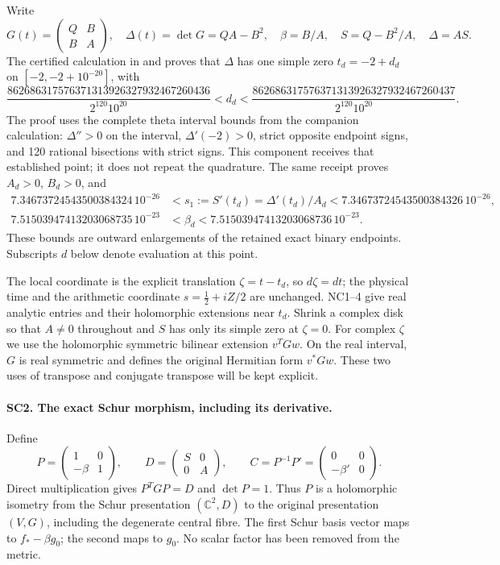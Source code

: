 Write
\[
 G(t)=\begin{pmatrix}Q&B\\B&A\end{pmatrix},\quad
 \Delta(t)=\det G=QA-B^2,\quad
 \beta=B/A,\quad S=Q-B^2/A,\quad \Delta=AS.
 \tag{SC3}
\]
The certified calculation in
 and
 proves that \(\Delta\) has
one simple zero \(t_d=-2+d_d\) on \([-2,-2+10^{-20}]\), with
\[
 \frac{862686317576371313926327932467260436}{2^{120}10^{20}}
 <d_d<
 \frac{862686317576371313926327932467260437}{2^{120}10^{20}}.
 \tag{SC4}
\]
The proof uses the complete theta interval bounds from the
companion calculation: \(\Delta''>0\) on the interval,
\(\Delta'(-2)>0\), strict opposite endpoint signs, and 120
rational bisections with strict signs. This component receives
that established point; it does not repeat the quadrature.
The same receipt proves \(A_d>0\), \(B_d>0\), and
\[
 \begin{split}
 7.34673724543500384324\,10^{-26}
 &<s_1:=S'(t_d)=\Delta'(t_d)/A_d
 <7.34673724543500384326\,10^{-26},\\
 7.51503947413203068735\,10^{-23}
 &<\beta_d<7.51503947413203068736\,10^{-23}.
 \end{split}\tag{SC5}
\]
These bounds are outward enlargements of the retained exact binary
endpoints. Subscripts \(d\) below denote evaluation at this point.

The local coordinate is the explicit translation
\(\zeta=t-t_d\), so \(d\zeta=dt\); the physical time and the
arithmetic coordinate \(s=\frac12+iZ/2\) are unchanged.
NC1--4 give real analytic entries and their holomorphic extensions
near \(t_d\). Shrink a complex disk so that \(A\ne0\) throughout
and \(S\) has only its simple zero at \(\zeta=0\).
For complex \(\zeta\) we use the holomorphic symmetric bilinear
extension \(v^TGw\). On the real interval, \(G\) is real symmetric
and defines the original Hermitian form \(v^*Gw\). These two uses
of transpose and conjugate transpose will be kept explicit.

\paragraph{SC2. The exact Schur morphism, including its derivative.}
Define
\[
 P=\begin{pmatrix}1&0\\-\beta&1\end{pmatrix},\qquad
 D=\begin{pmatrix}S&0\\0&A\end{pmatrix},\qquad
 C=P^{-1}P'=\begin{pmatrix}0&0\\-\beta'&0\end{pmatrix}.
 \tag{SC6}
\]
Direct multiplication gives \(P^TGP=D\) and \(\det P=1\).
Thus \(P\) is a holomorphic isometry from the Schur presentation
\((\mathbb C^2,D)\) to the original presentation
\((V,G)\), including the degenerate central fibre. The first
Schur basis vector maps to \(f_*-\beta g_0\); the second maps to
\(g_0\). No scalar factor has been removed from the metric.

